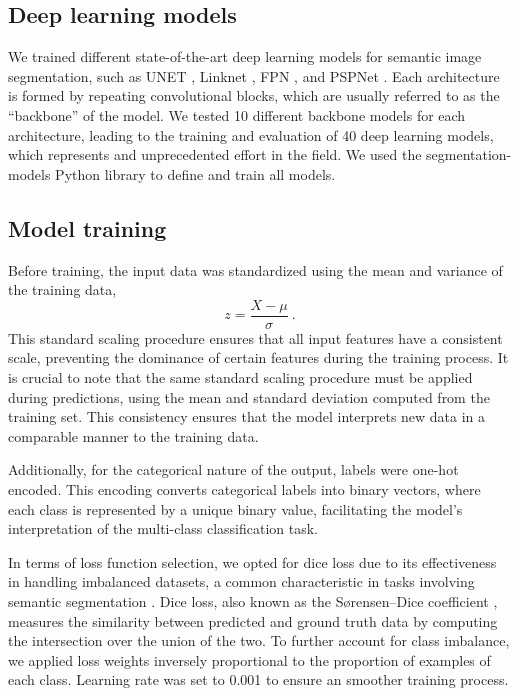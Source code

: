 \subsection{Deep learning models}

We trained different state-of-the-art deep learning models for semantic image
segmentation, such as UNET \cite{Ronneberger2015}, Linknet
\cite{Chaurasia2017}, FPN \cite{Lin2017} , and PSPNet \cite{Zhao2017}. Each
architecture is formed by repeating convolutional blocks, which are usually
referred to as the ``backbone'' of the model. We tested 10 different backbone
models for each architecture, leading to the training and evaluation of 40 deep
learning models, which represents and unprecedented effort in the field. We
used the segmentation-models Python library \cite{segmentation_models} to
define and train
all models.

\subsection{Model training}

Before training, the input data was standardized using the mean and variance of
the training data,
\begin{equation}
    z=\frac{X-\mu}{\sigma} \ .
\end{equation}
This standard scaling procedure ensures that all input features have a
consistent scale, preventing the dominance of certain features during the
training process. It is crucial to note that the same standard scaling
procedure must be applied during predictions, using the mean and standard
deviation computed from the training set. This consistency ensures that the
model interprets new data in a comparable manner to the training data.

Additionally, for the categorical nature of the output, labels were one-hot
encoded. This encoding converts categorical labels into binary vectors, where
each class is represented by a unique binary value, facilitating the model's
interpretation of the multi-class classification task.

In terms of loss function selection, we opted for dice loss due to its
effectiveness in handling imbalanced datasets, a common characteristic in tasks
involving semantic segmentation \cite{rahman2016optimizing}. Dice loss, also
known as the Sørensen–Dice coefficient \cite{sorensen1948method,
    dice1945measures}, measures the similarity between predicted and ground
truth
data by computing the intersection over the union of the two. To further
account for class imbalance, we applied loss weights inversely proportional to
the proportion of examples of each class. Learning rate was set to 0.001 to
ensure an smoother training process.

